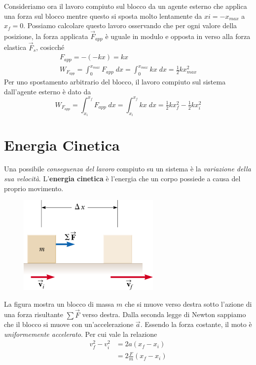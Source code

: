 \documentclass[a4paper,11pt,oneside]{book}
\begin{document}
Consideriamo ora il lavoro compiuto sul blocco da un agente esterno che applica una forza sul blocco mentre questo si sposta molto lentamente da $xi = -x_{max}$ a $x_f = 0$.
Possiamo calcolare questo lavoro osservando che per ogni valore della posizione, la forza applicata $\vec{F}_{app}$ è uguale in modulo e opposta in verso alla forza elastica $\vec{F}_s$, cosicché
\begin{gather*}
    F_{app} = -(-kx) = kx \\ 
    W_{F_{app}} = \int_{0}^{x_{max}} F_{app} \; dx = \int_{0}^{x_{max}} kx \; dx = \tfrac{1}{2}kx^2_{max}
\end{gather*}
Per uno spostamento arbitrario del blocco, il lavoro compiuto sul sistema dall'agente esterno è dato da 
\begin{equation*}
    W_{F_{app}} = \int_{x_i}^{x_f} F_{app} \; dx = \int_{x_i}^{x_f} kx \; dx = \tfrac{1}{2}kx_f^2 - \tfrac{1}{2} kx_i^2
\end{equation*}

\section{Energia Cinetica}
Una possibile \emph{conseguenza del lavoro} compiuto su un sistema è la \emph{variazione della sua velocità}. L'\textbf{energia cinetica} è l'energia che un corpo possiede a causa del proprio movimento.

\begin{figure}[h]
    \centering
    \includegraphics[scale=0.4]{energia_cinetica_schema.png}
\end{figure}
La figura mostra un blocco di massa $m$ che si muove verso destra sotto l’azione di una forza risultante $\sum \vec{F}$ verso destra. Dalla seconda legge di Newton sappiamo che il blocco si muove con un’accelerazione $\vec{a}$.
Essendo la forza costante, il moto è \emph{uniformemente accelerato}. Per cui vale la relazione
\begin{align*}
    v_f^2-v_i^2 &= 2a(x_f-x_i) \\
    &= 2\frac{F}{m}(x_f-x_i)
\end{align*}
\end{document}
